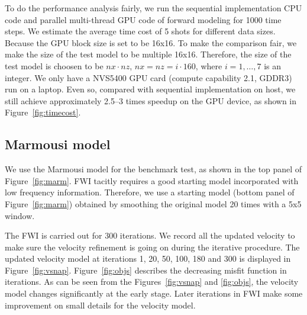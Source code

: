 To do the performance analysis fairly, we run the sequential implementation CPU code and parallel multi-thread GPU code of forward modeling for 1000 time steps. We estimate the average time cost of 5 shots for different data sizes. Because the GPU block size is set to be 16x16. To make the comparison fair, we make the size of the test model to be multiple 16x16. Therefore,  the size of the test model is choosen to be $nx\cdot nz$, $nx=nz=i\cdot160$, where $i=1,\ldots,7$ is an integer. We only have a NVS5400 GPU card (compute capability 2.1, GDDR3) run on a laptop. Even so, compared with sequential implementation on host, we still achieve approximately 2.5--3 times speedup on the GPU device, as shown in Figure~\ref{fig:timecost}. 




\subsection{Marmousi model}

We use the Marmousi model for the benchmark test, as shown in the top panel of Figure~\ref{fig:marm}.
FWI tacitly requires a good starting model incorporated with low frequency information. Therefore, we use a starting model (bottom panel of Figure~\ref{fig:marm}) obtained by smoothing the original model 20 times with a 5x5 window.

The FWI is carried out for 300 iterations. We record all the updated velocity to make sure the velocity refinement is going on during the iterative procedure. The updated velocity model at iterations 1, 20, 50, 100, 180 and 300 is displayed in Figure~\ref{fig:vsnap}. Figure~\ref{fig:objs} describes the decreasing misfit function in iterations. As can be seen from the Figures~\ref{fig:vsnap} and \ref{fig:objs}, the velocity model changes significantly at the early stage. Later iterations in FWI make some improvement on small details for the velocity model.




